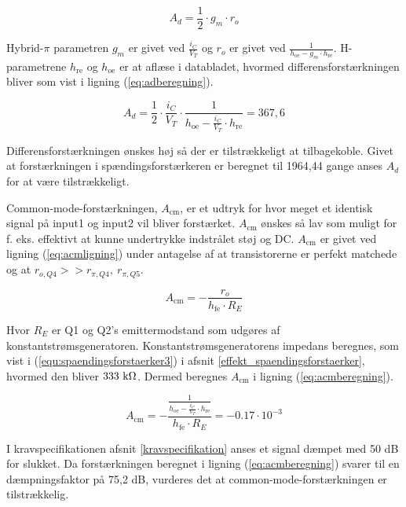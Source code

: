 \begin{equation}
A_d=\frac{1}{2} \cdot g_m \cdot r_o
\label{eq:diffforstaerkning}
\end{equation}

Hybrid-$\pi$ parametren $g_m$ er givet ved $\frac{i_C}{V_T}$ og $r_o$ er givet ved $\frac{1}{h_\mathrm{oe} - g_m \cdot h_\mathrm{re}}$. H-parametrene $h_\mathrm{re}$ og $h_\mathrm{oe}$ er at aflæse i databladet, hvormed differensforstærkningen bliver som vist i ligning (\ref{eq:adberegning}).

\begin{equation}
A_d=\frac{1}{2} \cdot \frac{i_C}{V_T} \cdot \frac{1}{h_\mathrm{oe} - \frac{i_C}{V_T} \cdot h_\mathrm{re}}=367,6
\label{eq:adberegning}
\end{equation}

Differensforstærkningen ønskes høj så der er tilstrækkeligt at tilbagekoble. Givet at forstærkningen i spændingsforstærkeren er beregnet til 1964,44 gange anses $A_d$ for at være tilstrækkeligt. 

Common-mode-forstærkningen, $A_\mathrm{cm}$, er et udtryk for hvor meget et identisk signal på input1 og input2 vil bliver forstærket. $A_\mathrm{cm}$ ønskes så lav som muligt for f. eks. effektivt at kunne undertrykke indstrålet støj og DC. $A_\mathrm{cm}$ er givet ved ligning (\ref{eq:acmligning}) under antagelse af at transistorerne er perfekt matchede og  at $r_{o,Q4}>>r_{\pi,Q4},~r_{\pi,Q5}$. 

\begin{equation}
A_\mathrm{cm} = -\frac{r_o}{h_\mathrm{fe} \cdot R_E}
\label{eq:acmligning}
\end{equation}

Hvor $R_E$ er Q1 og Q2's emittermodstand som udgøres af konstantstrømsgeneratoren. Konstantstrømsgeneratorens impedans beregnes, som vist i (\ref{equ:spaendingsforstaerker3}) i afsnit \ref{effekt_spaendingsforstaerker}, hvormed den bliver $333~\mathrm{k}\ohm$. Dermed beregnes $A_\mathrm{cm}$ i ligning (\ref{eq:acmberegning}).

\begin{equation}
A_\mathrm{cm} = -\frac{\frac{1}{h_\mathrm{oe} - \frac{i_C}{V_T} \cdot h_\mathrm{re}}}{h_\mathrm{fe} \cdot R_E} = -0.17 \cdot 10^{-3}
\label{eq:acmberegning}
\end{equation}

I kravspecifikationen afsnit \ref{kravspecifikation} anses et signal dæmpet med 50 dB for slukket. Da forstærkningen beregnet i ligning (\ref{eq:acmberegning}) svarer til en dæmpningsfaktor på 75,2 dB, vurderes det at common-mode-forstærkningen er tilstrækkelig. 

